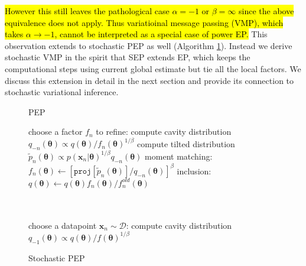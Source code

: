 \documentclass{article} %
\begin{document}
%
\hl{However this still leaves the pathological case $\alpha = -1$ or $\beta = \infty$ since the above equivalence does not apply. Thus variatioinal message passing (VMP), which takes $\alpha \rightarrow -1$, cannot be interpreted as a special case of power EP.} This observation extends to stochastic PEP as well (Algorithm \ref{alg:spep}). Instead we derive stochastic VMP in the spirit that SEP extends EP, which keeps the computational steps using current global estimate but tie all the local factors. We discuss this extension in detail in the next section and provide its connection to stochastic variational inference.

\begin{figure}[!t]
\begin{minipage}[t]{0.45\linewidth}
\centering
\begin{algorithm}[H] 
\caption{PEP} \small
\label{alg:pep} 
\begin{algorithmic}[1] 
	\STATE choose a factor $f_n$ to refine:
	\STATE compute cavity distribution \\$q_{-n}(\bm{\theta}) \propto q(\bm{\theta}) / f_n(\bm{\theta})^{1/\beta}$ 
	\STATE compute tilted distribution \\$\tilde{p}_n(\bm{\theta}) \propto p(\bm{x}_n|\bm{\theta})^{1 / \beta} q_{-n}(\bm{\theta})$
	\STATE moment matching: \\ \hspace{-1mm}$f_n(\bm{\theta}) \leftarrow [\mathtt{proj}[\tilde{p}_n(\bm{\theta})] / q_{-n}(\bm{\theta})]^{\beta} $
	\STATE inclusion:\\ $q(\bm{\theta}) \leftarrow q(\bm{\theta}) f_n(\bm{\theta}) / f_n^{old}(\bm{\theta})$\\
	\hspace{1mm}\\ \vspace{1.5mm} \hspace{1mm}\\
\end{algorithmic}
\end{algorithm}
\end{minipage}
%
\quad
%
\begin{minipage}[t]{0.45\linewidth}
\centering
\begin{algorithm}[H]
\caption{Stochastic PEP} \small
\label{alg:spep} 
\begin{algorithmic}[1] 
	\STATE choose a datapoint $\bm{x}_n\sim \mathcal{D}$:
	\STATE compute cavity distribution \\ $q_{-1}(\bm{\theta}) \propto q(\bm{\theta}) / f(\bm{\theta})^{1/\beta}$

\end{algorithmic}
\end{algorithm}
\end{minipage}
\end{figure}
\end{document}
